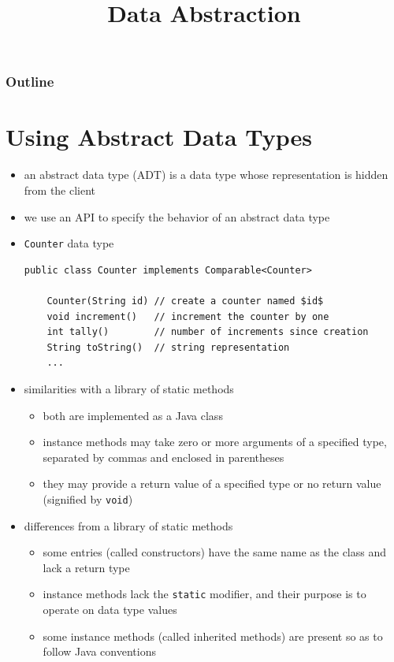 \documentclass[8pt,a4paper,compress]{beamer}
\title{Data Abstraction}
\date{}
\begin{document}
\begin{frame}
\vfill
\titlepage
\end{frame}

\begin{frame}
\frametitle{Outline}
\tableofcontents
\end{frame}

\section{Using Abstract Data Types}
\begin{frame}[fragile]
\begin{itemize}
\item an abstract data type (ADT) is a data type whose representation is hidden from the client

\item we use an API to specify the behavior of an abstract data type

\item \lstinline{Counter} data type
\begin{lstlisting}[language={},mathescape]
public class Counter implements Comparable<Counter> 

    Counter(String id) // create a counter named $id$
    void increment()   // increment the counter by one
    int tally()        // number of increments since creation
    String toString()  // string representation
    ...
\end{lstlisting}

\item similarities with a library of static methods
\begin{itemize}
\item both are implemented as a Java class
\item instance methods may take zero or more arguments of a specified type, separated by commas and enclosed in parentheses
\item they may provide a return value of a specified type or no return value (signified by \lstinline{void})
\end{itemize}

\item differences from a library of static methods
\begin{itemize}
\item some entries (called constructors) have the same name as the class and lack a return type
\item instance methods lack the \lstinline{static} modifier, and their purpose is to operate on data type values
\item some instance methods (called inherited methods) are present so as to follow Java conventions
\end{itemize}
\end{itemize}
\end{frame}
\end{document}
